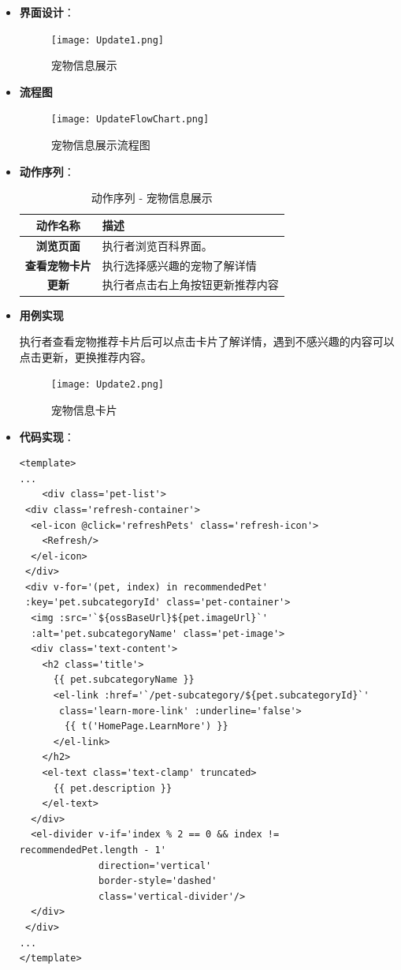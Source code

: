 \begin{itemize}
	\item \textbf{界面设计}：
	\begin{figure}[H]
		\centering
		\texttt{[image: Update1.png]}
		\caption{宠物信息展示}
		\label{宠物信息展示}
	\end{figure}
	
	\item \textbf{流程图}
	
	\begin{figure}[H]
		\centering
		\texttt{[image: UpdateFlowChart.png]}
		\caption{宠物信息展示流程图}
		\label{宠物信息展示流程图}
	\end{figure}
	
	\item \textbf{动作序列}：
	\begin{table}[H]
		\centering
		\caption{动作序列 - 宠物信息展示}
		\renewcommand\arraystretch{1.5}
		\begin{tabular}{|c|>{\raggedright\arraybackslash}p{10cm}|}
			\hline
			\textbf{动作名称} & \textbf{描述} \\ \hline
			\textbf{浏览页面} & 执行者浏览百科界面。\\ \hline
			\textbf{查看宠物卡片} & 执行选择感兴趣的宠物了解详情\\ \hline
			\textbf{更新} & 执行者点击右上角按钮更新推荐内容\\ \hline
		\end{tabular}
	\end{table}
	
	\item \textbf{用例实现}
	
	执行者查看宠物推荐卡片后可以点击卡片了解详情，遇到不感兴趣的内容可以点击更新，更换推荐内容。
	
	\begin{figure}[H]
		\centering
		\texttt{[image: Update2.png]}
		\caption{宠物信息卡片}
		\label{宠物信息卡片}
	\end{figure}
	
	\item \textbf{代码实现}：
	\begin{verbatim}
<template>
...
	<div class='pet-list'>
 <div class='refresh-container'>
  <el-icon @click='refreshPets' class='refresh-icon'>
    <Refresh/>
  </el-icon>
 </div>
 <div v-for='(pet, index) in recommendedPet' 
 :key='pet.subcategoryId' class='pet-container'>
  <img :src='`${ossBaseUrl}${pet.imageUrl}`' 
  :alt='pet.subcategoryName' class='pet-image'>
  <div class='text-content'>
    <h2 class='title'>
      {{ pet.subcategoryName }}
      <el-link :href='`/pet-subcategory/${pet.subcategoryId}`'
       class='learn-more-link' :underline='false'>
        {{ t('HomePage.LearnMore') }}
      </el-link>
    </h2>
    <el-text class='text-clamp' truncated>
      {{ pet.description }}
    </el-text>
  </div>
  <el-divider v-if='index % 2 == 0 && index != recommendedPet.length - 1'
              direction='vertical'
              border-style='dashed'
              class='vertical-divider'/>
  </div>
 </div>
...
</template>
	\end{verbatim}
	

\end{itemize}
